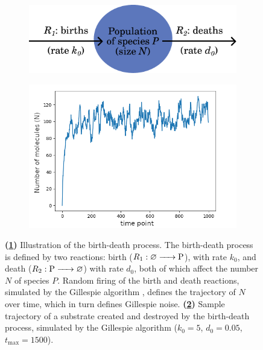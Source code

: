 \begin{figure}
  \centering
  \begin{subfigure}[t]{0.6\textwidth}
    \centering
    \includegraphics[width=\textwidth]{birth_death_process}
    \caption{
    }
    \label{fig:analysis-birthdeath-process-illustration}
  \end{subfigure}

  \begin{subfigure}[t]{0.4\textwidth}
    \centering
    \includegraphics[width=\textwidth]{gillespie}
    \caption{
    }
    \label{fig:gillespie_trajectory}
  \end{subfigure}

  \caption[
    Illustration of the birth-death process.
  ]{
    \textbf{(\ref{fig:analysis-birthdeath-process-illustration})}
    Illustration of the birth-death process.
    The birth-death process is defined by two reactions: birth ($R_{1}: \varnothing \ce{ -> P}$), with rate $k_{0}$, and death ($R_{2}: \ce{P -> } \varnothing$) with rate $d_{0}$, both of which affect the number $N$ of species $P$.
    Random firing of the birth and death reactions, simulated by the Gillespie algorithm \parencite{gillespieStochasticSimulationChemical2007}, defines the trajectory of $N$ over time, which in turn defines Gillespie noise.
    \textbf{(\ref{fig:gillespie_trajectory})}
    Sample trajectory of a substrate created and destroyed by the birth-death process, simulated by the Gillespie algorithm ($k_{0} = 5$, $d_{0} = 0.05$, $t_{\mathrm{max}} = 1500$).
  }
  \label{fig:analysis-birthdeath-process}
\end{figure}

